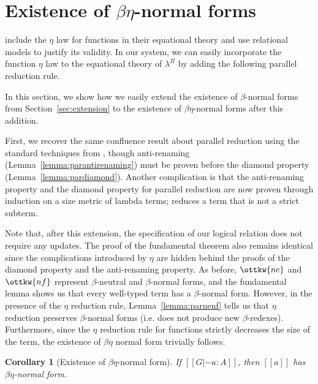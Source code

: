 \documentclass[\ifpublic nolinenum\else\fi,online,OA]{jfp}
\newcommand{\lang}{$\lambda^{\Pi}$\xspace}
\newtheorem{corollary}[theorem]{Corollary}
\theoremstyle{definition}
\begin{document}
\section{Existence of \texorpdfstring{$\beta\eta$-}{beta-eta--}normal forms}
\label{sec:betaeta}

\citet{nbeincoq,decagda,martin-lof-a-la-coq}
include the $\eta$ law for functions in their equational theory and
use relational models to justify its validity.
In our system, we can easily incorporate the function $\eta$ law to the equational
theory of \lang{} by adding the following parallel reduction rule.
\begin{center}
\end{center}
In this section, we show how we easily extend the existence of $\beta$-normal
forms from Section~\ref{sec:extension} to the existence of
$\beta\eta$-normal forms after this addition. 

First, we recover the same confluence result about parallel reduction using the
standard techniques from \citet{barendregt:lambda-calculi-with-types,
  takahashi-parallel-reduction}, though anti-renaming
(Lemma~\ref{lemma:parantirenaming}) must be proven before the diamond property
(Lemma~\ref{lemma:pardiamond}). Another complication is that
the anti-renaming property and the diamond property for parallel reduction are now proven through
induction on a size metric of lambda terms;  reduces a term
that is not a strict subterm.

Note that, after this extension, the specification of our logical
relation does not require
any updates. The proof of the fundamental theorem also remains
identical since the complications introduced by $\eta$ are hidden
behind the proofs of the diamond property and the anti-renaming property.
As before, $\ottkw{ne}$ and $\ottkw{nf}$
represent $\beta$-neutral and $\beta$-normal forms, and the
fundamental lemma shows us that every well-typed term has a
$\beta$-normal form. However, in the presence of the $\eta$ reduction
rule, Lemma~\ref{lemma:parnenf} tells us that $\eta$ reduction
preserves $\beta$-normal forms (i.e. does not produce new
$\beta$-redexes). Furthermore, since the $\eta$ reduction rule for
functions strictly decreases the size of the term, the existence of
$\beta\eta$ normal form trivially follows.
\begin{corollary}[Existence of $\beta\eta$-normal form]
\label{corollary:exbetaeta}
If $[[G |- a : A]]$, then $[[a]]$ has $\beta\eta$-normal form.
\end{corollary}
\end{document}
